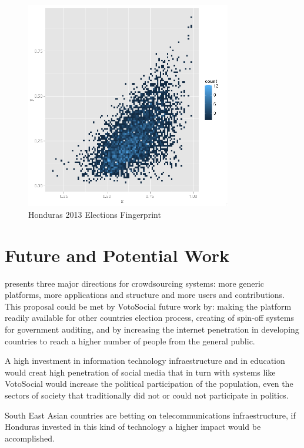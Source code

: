 \documentclass[letterpaper,10pt]{article}
\begin{document}
\begin{figure}[h!]
    \centering
    \includegraphics[width=0.8\textwidth]{images/fingerprint}
    \caption{Honduras 2013 Elections Fingerprint}
    \label{fig:fingerprint}
\end{figure}

\section{Future and Potential Work}

\cite{doan2011} presents three major directions for crowdsourcing systems: more generic platforms, more applications and structure and more users and contributions. This proposal could be met by VotoSocial future work by: making the platform readily available for other countries election process, creating of spin-off systems for government auditing, and by increasing the internet penetration in developing countries to reach a higher number of people from the general public.

A high investment in information technology infraestructure and in education would creat high penetration of social media \citep{saadia2014} that in turn with systems like VotoSocial would increase the political participation of the population, even the sectors of society that traditionally did not or could not participate in politics.

South East Asian countries are betting on telecommunications infraestructure, if Honduras invested in this kind of technology a higher impact would be accomplished. 
\end{document}
